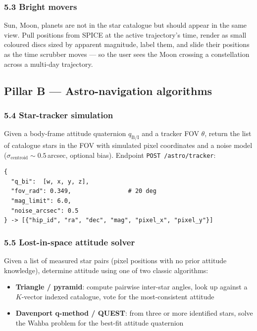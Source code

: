 \documentclass[11pt, a4paper]{article}
\begin{document}
\subsubsection{5.3 Bright movers}

Sun, Moon, planets are not in the star catalogue but should appear in the
same view. Pull positions from SPICE at the active trajectory's time, render
as small coloured discs sized by apparent magnitude, label them, and slide
their positions as the time scrubber moves --- so the user sees the Moon
crossing a constellation across a multi-day trajectory.

\subsection{Pillar B --- Astro-navigation algorithms}

\subsubsection{5.4 Star-tracker simulation}

Given a body-frame attitude quaternion $q_\text{B/I}$ and a tracker FOV
$\theta$, return the list of catalogue stars in the FOV with simulated
pixel coordinates and a noise model
($\sigma_\text{centroid} \sim 0.5\,$arcsec, optional bias).
Endpoint \texttt{POST /astro/tracker}:

\begin{verbatim}
{
  "q_bi":  [w, x, y, z],
  "fov_rad": 0.349,                # 20 deg
  "mag_limit": 6.0,
  "noise_arcsec": 0.5
} -> [{"hip_id", "ra", "dec", "mag", "pixel_x", "pixel_y"}]
\end{verbatim}

\subsubsection{5.5 Lost-in-space attitude solver}

Given a list of measured star pairs (pixel positions with no prior attitude
knowledge), determine attitude using one of two classic algorithms:

\begin{itemize}[leftmargin=*]
  \item \textbf{Triangle / pyramid}: compute pairwise inter-star angles,
        look up against a $K$-vector indexed catalogue, vote for the
        most-consistent attitude
  \item \textbf{Davenport q-method / QUEST}: from three or more identified
        stars, solve the Wahba problem for the best-fit attitude quaternion
\end{itemize}
\end{document}
